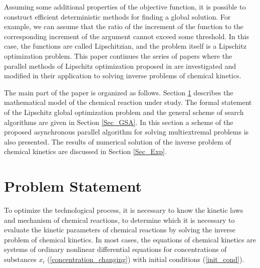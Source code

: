 \documentclass{svproc}
\begin{document}

Assuming some additional properties of the objective function, it is possible to construct efficient deterministic methods for finding a global solution. For example, we can assume that the ratio of the increment of the function to the corresponding increment of the argument cannot exceed some threshold. In this case, the functions are called Lipschitzian, and the problem itself is a Lipschitz optimization problem.
This paper continues the series of papers where the parallel methods of Lipschitz optimization proposed in \cite{Strongin2000} are investigated and modified in their application to solving inverse problems of chemical kinetics.


The main part of the paper is organized as follows. Section \ref{Sec_math_mod} describes the mathematical model of the chemical reaction under study. The formal statement of the Lipschitz global optimization problem and the general scheme of search algorithms are given in Section \ref{Sec_GSA}. In this section a scheme of the proposed asynchronous parallel algorithm for solving multiextremal problems is also presented. The results of numerical solution of the inverse problem of chemical kinetics are discussed in Section \ref{Sec_Exp}.

\section{Problem Statement} \label{Sec_math_mod}

To optimize the technological process, it is necessary to know the kinetic laws and mechanism of chemical reactions, to determine which it is necessary to evaluate the kinetic parameters of chemical reactions by solving the inverse problem of chemical kinetics\cite{regularization}. In most cases, the equations of chemical kinetics are systems of ordinary nonlinear differential equations for concentrations of substances $x_{i}$ (\ref{concentration_changing}) with initial conditions (\ref{init_cond}).
\end{document}

